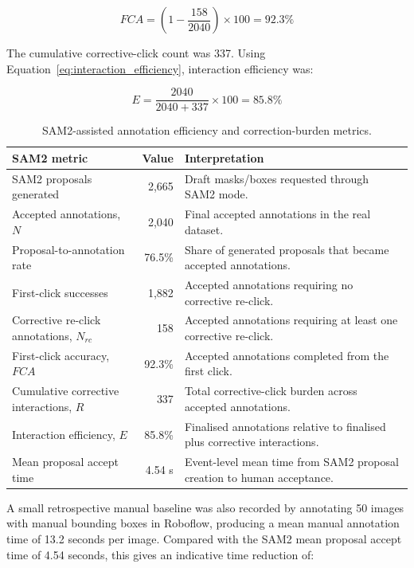 \begin{equation}
FCA = \left(1 - \frac{158}{2040}\right) \times 100 = 92.3\%
\end{equation}

The cumulative corrective-click count was 337. Using Equation~\ref{eq:interaction_efficiency}, interaction efficiency was:

\begin{equation}
E = \frac{2040}{2040 + 337} \times 100 = 85.8\%
\end{equation}

\begin{table}[H]
\centering
\small
\renewcommand{\arraystretch}{1.2}
\begin{tabularx}{\textwidth}{p{} r X}
\toprule
\textbf{SAM2 metric} & \textbf{Value} & \textbf{Interpretation} \\
\midrule
SAM2 proposals generated & 2,665 & Draft masks/boxes requested through SAM2 mode. \\
Accepted annotations, $N$ & 2,040 & Final accepted annotations in the real dataset. \\
Proposal-to-annotation rate & 76.5\% & Share of generated proposals that became accepted annotations. \\
First-click successes & 1,882 & Accepted annotations requiring no corrective re-click. \\
Corrective re-click annotations, $N_{rc}$ & 158 & Accepted annotations requiring at least one corrective re-click. \\
First-click accuracy, $FCA$ & 92.3\% & Accepted annotations completed from the first click. \\
Cumulative corrective interactions, $R$ & 337 & Total corrective-click burden across accepted annotations. \\
Interaction efficiency, $E$ & 85.8\% & Finalised annotations relative to finalised plus corrective interactions. \\
Mean proposal accept time & 4.54 s & Event-level mean time from SAM2 proposal creation to human acceptance. \\
\bottomrule
\end{tabularx}
\caption{SAM2-assisted annotation efficiency and correction-burden metrics.}
\label{tab:dce_results_sam2}
\end{table}

A small retrospective manual baseline was also recorded by annotating 50 images with manual bounding boxes in Roboflow, producing a mean manual annotation time of 13.2 seconds per image. Compared with the SAM2 mean proposal accept time of 4.54 seconds, this gives an indicative time reduction of:

